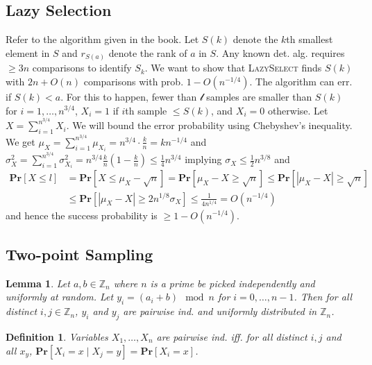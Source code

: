 \documentclass[12pt]{article}
\newtheorem{lem}[thm]{Lemma}
\newtheorem{dfn}[thm]{Definition}
\begin{document}
\subsection{Lazy Selection}
Refer to the algorithm given in the book. Let $S(k)$ denote the $k$th smallest element in $S$ and $r_{S(a)}$ denote the rank of $a$ in $S$. Any known det. alg. requires $\geq 3n$ comparisons to identify $S_{k}$. We want to show that \textsc{LazySelect} finds $S(k)$ with $2n + O(n)$ comparisons with prob. $1-O(n^{-1/4})$. The algorithm can err. if $S(k) < a$. For this to happen, fewer than $\mathcal{l}$ samples are smaller than $S(k)$ for $i=1, \hdots, n^{3/4}$, $X_i=1$ if $i$th sample $\leq S(k)$, and $X_i = 0$ otherwise. Let $X=\sum^{n^{3/4}}_{i=1} X_i$. We will bound the error probability using Chebyshev's inequality. We get $\mu_X = \sum^{n^{3/4}}_{i=1} \mu_{X_i} = n^{3/4}\cdot \frac{k}{n}=kn^{-1/4}$ and $\sigma_X^2 = \sum^{n^{3/4}}_{i=1} \sigma^2_{X_i} = n^{3/4}\frac{k}{n}\left( 1-\frac{k}{n} \right) \leq \frac{1}{4}n^{3/4}$ implying $\sigma_X \leq \frac{1}{2}n^{3/8}$ and
\begin{align*}
\mathbf{Pr} \left[ X \leq l \right] &= \mathbf{Pr} \left[ X \leq \mu_X - \sqrt{n} \right] = \mathbf{Pr} \left[ \mu_X - X \geq \sqrt{n} \right] \leq \mathbf{Pr} \left[ \left| \mu_X - X \right| \geq \sqrt{n} \right] \\
&\leq \mathbf{Pr} \left[ \left| \mu_X - X \right| \geq 2n^{1/8}\sigma_X \right] \leq \frac{1}{4n^{1/4}} = O(n^{-1/4})
\end{align*}
and hence the success probability is $\geq 1-O(n^{-1/4})$.

\subsection{Two-point Sampling}
\begin{lem}
Let $a,b \in \mathbb{Z}_n$ where $n$ is a prime be picked independently and uniformly at random. Let $y_i = (a_i + b) \mod n$ for $i = 0, \hdots, n-1$. Then for all distinct $i,j \in \mathbb{Z}_n$, $y_i$ and $y_j$ are pairwise ind. and uniformly distributed in $\mathbb{Z}_n$. \\
\end{lem}

\begin{dfn}
Variables $X_1, \hdots, X_n$ are pairwise ind. iff. for all distinct $i,j$ and all $x_y$, $\mathbf{Pr}\left[ X_i = x \; | \; X_j = y \right] = \mathbf{Pr}\left[ X_i = x \right]$. \\
\end{dfn}
\end{document}
